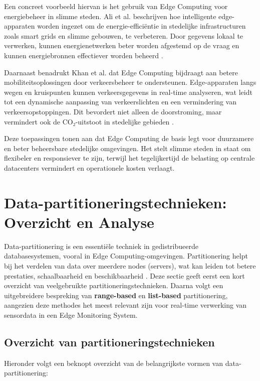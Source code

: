 Een concreet voorbeeld hiervan is het gebruik van Edge Computing voor energiebeheer in slimme steden. Ali et al. beschrijven hoe intelligente edge-apparaten worden ingezet om de energie-efficiëntie in stedelijke infrastructuren zoals smart grids en slimme gebouwen, te verbeteren. Door gegevens lokaal te verwerken, kunnen energienetwerken beter worden afgestemd op de vraag en kunnen energiebronnen effectiever worden beheerd \autocite{EnergyManagement2023}.
 
Daarnaast benadrukt Khan et al. dat Edge Computing bijdraagt aan betere mobiliteitsoplossingen door verkeersbeheer te ondersteunen. Edge-apparaten langs wegen en kruispunten kunnen verkeersgegevens in real-time analyseren, wat leidt tot een dynamische aanpassing van verkeerslichten en een vermindering van verkeersopstoppingen. Dit bevordert niet alleen de doorstroming, maar vermindert ook de CO₂-uitstoot in stedelijke gebieden \autocite{EdgeSmartCities2023}.
 
Deze toepassingen tonen aan dat Edge Computing de basis legt voor duurzamere en beter beheersbare stedelijke omgevingen. Het stelt slimme steden in staat om flexibeler en responsiever te zijn, terwijl het tegelijkertijd de belasting op centrale datacenters vermindert en operationele kosten verlaagt.

\section{Data-partitioneringstechnieken: Overzicht en Analyse}

Data-partitionering is een essentiële techniek in gedistribueerde databasesystemen, vooral in Edge Computing-omgevingen. Partitionering helpt bij het verdelen van data over meerdere nodes (servers), wat kan leiden tot betere prestaties, schaalbaarheid en beschikbaarheid \autocite{Karger1997}.
Deze sectie geeft eerst een kort overzicht van veelgebruikte partitioneringstechnieken. Daarna volgt een uitgebreidere bespreking van \textbf{range-based} en \textbf{list-based} partitionering, aangezien deze methodes het meest relevant zijn voor real-time verwerking van sensordata in een Edge Monitoring System.

\subsection{Overzicht van partitioneringstechnieken}

Hieronder volgt een beknopt overzicht van de belangrijkste vormen van data-partitionering:

